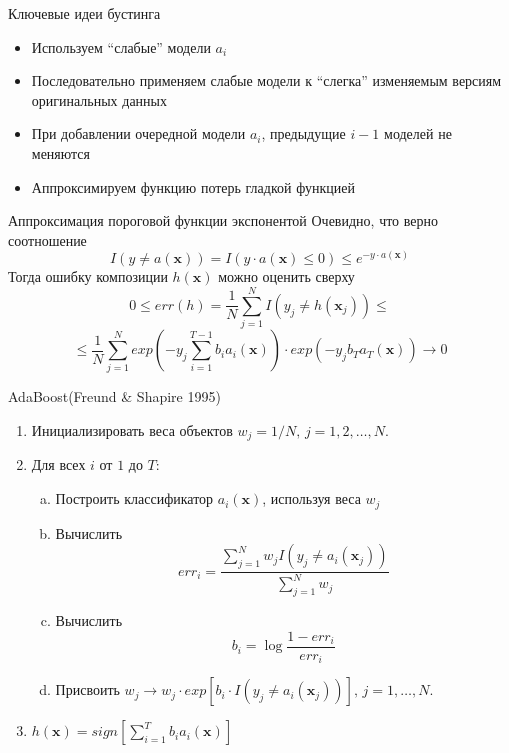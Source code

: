 \documentclass[10pt]{beamer}
\begin{document}
\begin{frame}{Ключевые идеи бустинга}
\begin{itemize}
\item Используем ``слабые'' модели $a_i$
\item Последовательно применяем слабые модели к ``слегка'' изменяемым версиям
    оригинальных данных
\item При добавлении очередной модели $a_i$, предыдущие $i-1$ моделей не
    меняются
\item Аппроксимируем функцию потерь гладкой функцией
\end{itemize}
\end{frame}

\begin{frame}{Аппроксимация пороговой функции экспонентой}
Очевидно, что верно соотношение
\[
    I(y \neq a(\mathbf{x})) = I(y \cdot a(\mathbf{x}) \le 0) \le e^{-y \cdot a(\mathbf{x})}
\]
Тогда ошибку композиции $h(\mathbf{x})$ можно оценить сверху
\[
    0 \le err(h) = \frac{1}{N} \sum \limits _{j=1}^N I(y_j \neq h(\mathbf{x}_j)) \le
\]
\[
    \le \frac{1}{N} \sum \limits _{j=1}^N exp \left(-y_j \sum \limits _{i=1}^{T-1} b_i
    a_i(\mathbf{x}) \right) \cdot exp(-y_j b_T a_T( \mathbf{x} )) \rightarrow 0
\]
\end{frame}

\begin{frame}{AdaBoost(Freund \& Shapire 1995)}
\begin{enumerate}
    \item Инициализировать веса объектов $w_j=1/N, \, j=1,2,\ldots,N$.
    \item Для всех $i$ от $1$ до $T$:
    \begin{enumerate}[(a)]
        \item Построить классификатор $a_i(\mathbf{x})$, используя веса $w_j$
        \item Вычислить
        \[
            err_i = \frac{\sum_{j=1}^N w_j I(y_j \neq a_i(\mathbf{x}_j)
            )}{\sum_{j=1}^N w_j}
        \]
        \item Вычислить 
        \[
            b_i = \log{\frac{1-err_i}{err_i}}
        \]
        \item Присвоить $w_j \rightarrow w_j \cdot exp[b_i \cdot I(y_j \neq
            a_i(\mathbf{x}_j))], \, j=1,\ldots,N.$
\end{enumerate}
    \item $h(\mathbf{x}) = sign\left[ \sum _{i=1}^T b_i a_i(\mathbf{x})   \right ]$
\end{enumerate}
\end{frame}
\end{document}
